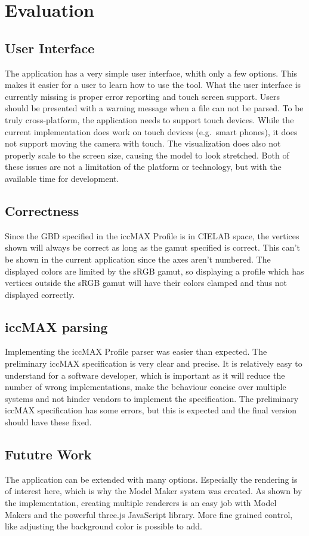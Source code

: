 \section{Evaluation}
\subsection{User Interface}
The application has a very simple user interface, whith only a few options.
This makes it easier for a user to learn how to use the tool.
What the user interface is currently missing is proper error reporting and touch screen support.
Users should be presented with a warning message when a file can not be parsed.
To be truly cross-platform, the application needs to support touch devices.
While the current implementation does work on touch devices (e.g.\ smart phones), it does not support moving the camera with touch.
The visualization does also not properly scale to the screen size, causing the model to look stretched.
Both of these issues are not a limitation of the platform or technology, but with the available time for development.

\subsection{Correctness}
Since the GBD specified in the iccMAX Profile is in CIELAB space, the vertices shown will always be correct as long as the gamut specified is correct.
This can't be shown in the current application since the axes aren't numbered.
The displayed colors are limited by the sRGB gamut, so displaying a profile which has vertices outside the sRGB gamut will have their colors clamped and thus not displayed correctly.

\subsection{iccMAX parsing}
Implementing the iccMAX Profile parser was easier than expected.
The preliminary iccMAX specification is very clear and precise.
It is relatively easy to understand for a software developer, which is important as it will reduce the number of wrong implementations, make the behaviour concise over multiple systems and not hinder vendors to implement the specification.
The preliminary iccMAX specification has some errors, but this is expected and the final version should have these fixed.

\subsection{Fututre Work}
The application can be extended with many options.
Especially the rendering is of interest here, which is why the Model Maker system was created.
As shown by the implementation, creating multiple renderers is an easy job with Model Makers and the powerful three.js JavaScript library.
More fine grained control, like adjusting the background color is possible to add.

